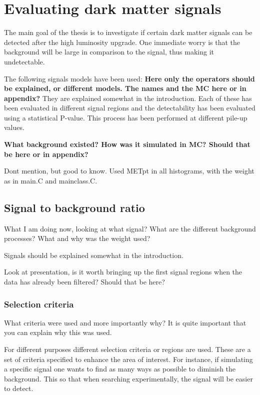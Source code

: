 \chapter{Evaluating dark matter signals}
The main goal of the thesis is to investigate if certain dark matter signals can be detected after the high luminosity upgrade. One immediate worry is that the background will be large in comparison to the signal, thus making it undetectable. 

The following signals models have been used:
\textbf{Here only the operators should be explained, or different models. The names and the MC here or in appendix?} They are explained somewhat in the introduction.
Each of these has been evaluated in different signal regions and the detectability has been evaluated using a statistical P-value. This process has been performed at different pile-up values. 

\textbf{What background existed? How was it simulated in MC? Should that be here or in appendix?}


Dont mention, but good to know. Used METpt in all histograms, with the weight as in main.C and mainclass.C. 


\section{Signal to background ratio}
What I am doing now, looking at what signal? What are the different background processes? What and why was the weight used?

Signals should be explained somewhat in the introduction.



Look at presentation, is it worth bringing up the first signal regions when the data has already been filtered? Should that be here?
 
\subsection{Selection criteria}
What criteria were used and more importantly why? It is quite important that you can explain why this was used.

For different purposes different selection criteria or regions are used. These are a set of criteria specified to enhance the area of interest. For instance, if simulating a specific signal one wants to find as many ways as possible to diminish the background. This so that when searching experimentally, the signal will be easier to detect.

